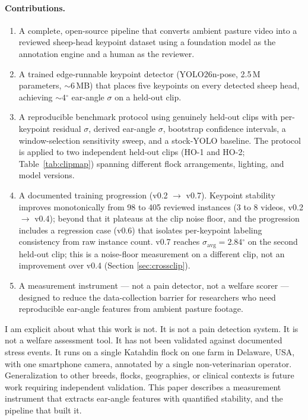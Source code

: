 \documentclass[11pt]{article}
\newcommand{\dgr}{\ensuremath{^{\circ}}}
\newcommand{\sigavg}{\ensuremath{\sigma_{\text{avg}}}}
\begin{document}
\paragraph{Contributions.}
\begin{enumerate}
  \item A complete, open-source pipeline that converts ambient pasture video
  into a reviewed sheep-head keypoint dataset using a foundation model as the
  annotation engine and a human as the reviewer.
  \item A trained edge-runnable keypoint detector (YOLO26n-pose, 2.5\,M
  parameters, ${\sim}6$\,MB) that places five keypoints on every detected sheep
  head, achieving ${\sim}4\dgr$ ear-angle $\sigma$ on a held-out clip.
  \item A reproducible benchmark protocol using genuinely held-out clips with
  per-keypoint residual $\sigma$, derived ear-angle $\sigma$, bootstrap
  confidence intervals, a window-selection sensitivity sweep, and a stock-YOLO
  baseline. The protocol is applied to
  two independent held-out clips (HO-1 and HO-2; Table~\ref{tab:clipmap})
  spanning different flock arrangements, lighting,
  and model versions.
  \item A documented training progression (v0.2 $\rightarrow$ v0.7). Keypoint
  stability improves monotonically from 98 to 405 reviewed instances (3 to 8
  videos, v0.2 $\rightarrow$ v0.4); beyond that it plateaus at the clip noise
  floor, and the progression includes a regression case (v0.6) that isolates
  per-keypoint labeling consistency from raw instance count. v0.7 reaches
  $\sigavg = 2.84\dgr$ on the second held-out clip; this is a noise-floor
  measurement on a different clip, not an improvement over v0.4 (Section
  \ref{sec:crossclip}).
  \item A measurement instrument --- not a pain detector, not a welfare scorer
  --- designed to reduce the data-collection barrier for researchers who need
  reproducible ear-angle features from ambient pasture footage.
\end{enumerate}

I am explicit about what this work is not. It is not a pain detection system. It
is not a welfare assessment tool. It has not been validated against documented
stress events. It runs on a single Katahdin flock on one farm in Delaware, USA,
with one smartphone camera, annotated by a single non-veterinarian operator.
Generalization to other breeds, flocks, geographies, or clinical contexts is
future work requiring independent validation. This paper describes a measurement
instrument that extracts ear-angle features with quantified stability, and the
pipeline that built it.
\end{document}
